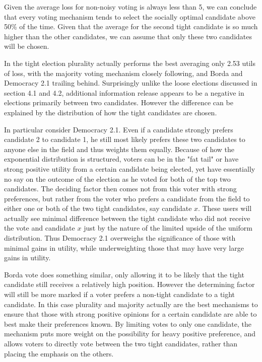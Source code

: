 \documentclass[11pt]{scrartcl}
\begin{document}
Given the average loss for non-noisy voting is always less than 5, we can conclude that every voting mechanism tends to select the socially optimal candidate above 50\% of the time. Given that the average for the second tight candidate is so much higher than the other candidates, we can assume that only these two candidates will be chosen.

In the tight election plurality actually performs the best averaging only 2.53 utils of loss, with the majority voting mechanism closely following, and Borda and Democracy 2.1 trailing behind. Surprisingly unlike the loose elections discussed in section 4.1 and 4.2, additional information release appears to be a negative in elections primarily between two candidates. However the difference can be explained by the distribution of how the tight candidates are chosen.

In particular consider Democracy 2.1. Even if a candidate strongly prefers candidate 2 to candidate 1, he still most likely prefers these two candidates to anyone else in the field and thus weights them equally.  Because of how the exponential distribution is structured, voters can be in the "fat tail" or have strong positive utility from a certain candidate being elected, yet have essentially no say on the outcome of the election as he voted for both of the top two candidates. The deciding factor then comes not from this voter with strong preferences, but rather from the voter who prefers a candidate from the field to either one or both of the two tight candidates, say candidate $x$. These users will actually see minimal difference between the tight candidate who did not receive the vote and candidate $x$ just by the nature of the limited upside of the uniform distribution. Thus Democracy 2.1 overweighs the significance of those with minimal gains in utility, while underweighting those that may have very large gains in utility.

Borda vote does something similar, only allowing it to be likely that the tight candidate still receives a relatively high position. However the determining factor will still be more marked if a voter prefers a non-tight candidate to a tight candidate. In this case plurality and majority actually are the best mechanisms to ensure that those with strong positive opinions for a certain candidate are able to best make their preferences known. By limiting votes to only one candidate, the mechanism puts more weight on the possibility for heavy positive preference, and allows voters to directly vote between the two tight candidates, rather than placing the emphasis on the others.
\end{document}
